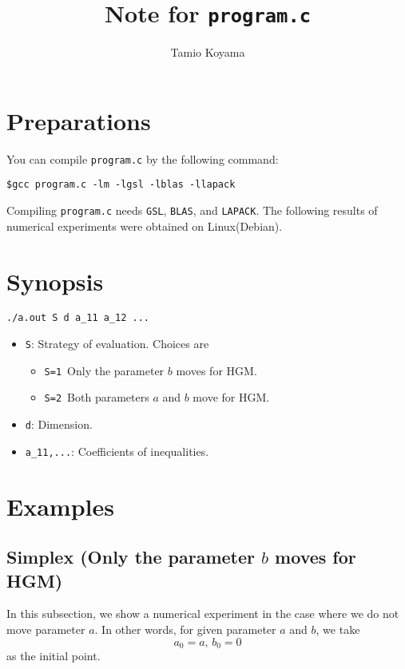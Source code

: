 \documentclass[12pt]{article}
\title{Note for {\tt program.c}}
\author{Tamio Koyama}
\date{}
\theoremstyle{definition}
\begin{document}
\maketitle
\section{Preparations}
You can compile {\tt program.c} by the following command:
\begin{framed}
\begin{verbatim}
$gcc program.c -lm -lgsl -lblas -llapack
\end{verbatim}
\end{framed}
Compiling {\tt program.c} needs {\tt GSL}, {\tt BLAS}, and {\tt LAPACK}.
The following results of numerical experiments were obtained 
on Linux(Debian).

\section{Synopsis}
\begin{verbatim}
./a.out S d a_11 a_12 ...
\end{verbatim}
\begin{itemize}
\item \verb+S+\/: Strategy of evaluation. Choices are
  \begin{itemize}
    \item \verb+S=1+\ Only the parameter $b$ moves for HGM.
    \item \verb+S=2+\ Both parameters $a$ and $b$ move for HGM.
  \end{itemize}
\item \verb+d+\/: Dimension.
\item \verb+a_11,...+\/: Coefficients of inequalities.
\end{itemize}

\section{Examples}
\subsection{Simplex (Only the parameter $b$ moves for HGM)}
In this subsection, we show a numerical experiment in the case where
we do not move parameter $a$.
In other words, for given parameter $a$ and $b$, we take 
$$
a_0 = a,\,b_0 = 0
$$
as the initial point.
\end{document}
